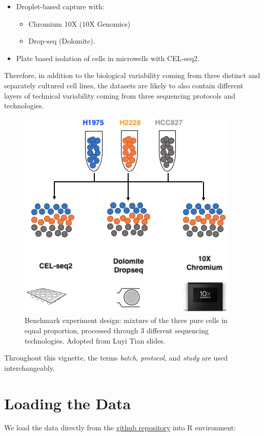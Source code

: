 \documentclass[]{book}
\providecommand{\tightlist}{%
  \setlength{\itemsep}{0pt}\setlength{\parskip}{0pt}}
\theoremstyle{definition}
\theoremstyle{definition}
\theoremstyle{definition}
\theoremstyle{remark}
\begin{document}
\begin{itemize}
\tightlist
\item
  Droplet-based capture with:

  \begin{itemize}
  \tightlist
  \item
    Chromium 10X (10X Genomics)
  \item
    Drop-seq (Dolomite).
  \end{itemize}
\item
  Plate based isolation of cells in microwells with CEL-seq2.
\end{itemize}

Therefore, in addition to the biological variability coming from three
distinct and separately cultured cell lines, the datasets are likely to
also contain different layers of technical variability coming from three
sequencing protocols and technologies.

\begin{figure}[ht]

{\centering \includegraphics[width=0.45\linewidth]{figures/exp_design3} 

}

\caption{Benchmark experiment design: mixture of the three pure cells in equal proportion, processed through 3 different sequencing technologies. Adopted from Luyi Tian slides.}\label{fig:1-Experimental-Design}
\end{figure}

Throughout this vignette, the terms \emph{batch}, \emph{protocol}, and
\emph{study} are used interchangeably.

\hypertarget{loading-the-data}{%
\section{Loading the Data}\label{loading-the-data}}

We load the data directly from the
\href{https://github.com/LuyiTian/CellBench_data/tree/master/data}{github
repository} into R environment:
\end{document}
